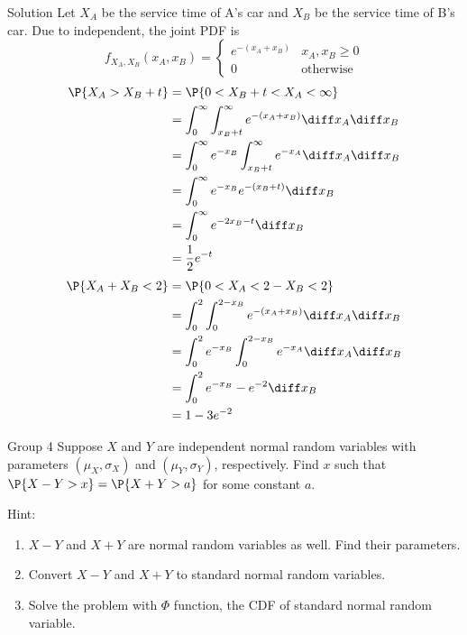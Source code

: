 \documentclass{article}
\theoremstyle{plain}
\theoremstyle{definition}
\theoremstyle{remark}
\begin{document}
\begin{solution}
    {Solution}
    Let $X_A$ be the service time of A's car and $X_B$ be the service time of B's car. Due to independent, the joint PDF is
    \[
    f_{X_A,X_B}(x_A,x_B) = {
        \begin{cases}
            e^{-(x_A+x_B)} & x_A,x_B\geq 0\\
            0 & \text{otherwise}
        \end{cases}
    }
    \]
    \begin{align*}
        \P{X_A>X_B+t}
        &= \P{0<X_B+t<X_A<\infty} \\
        &= \int_{0}^{\infty}\int_{x_B+t}^{\infty}e^{-(x_A+x_B)}\diff x_A \diff x_B \\
        &= \int_{0}^{\infty}e^{-x_B}\int_{x_B+t}^{\infty}e^{-x_A}\diff x_A \diff x_B \\
        &= \int_{0}^{\infty}e^{-x_B}e^{-(x_B+t)}\diff x_B \\
        &= \int_{0}^{\infty}e^{-2x_B-t}\diff x_B \\
        &= \frac{1}{2}e^{-t}
    \end{align*}
    \begin{align*}
        \P{X_A+X_B<2}
        &= \P{0<X_A<2-X_B<2} \\
        &= \int_{0}^{2}\int_{0}^{2-x_B}e^{-(x_A+x_B)}\diff x_A \diff x_B \\
        &= \int_{0}^{2}e^{-x_B}\int_{0}^{2-x_B}e^{-x_A}\diff x_A \diff x_B \\
        &= \int_{0}^{2}e^{-x_B}-e^{-2}\diff x_B \\
        &= 1-3e^{-2}
    \end{align*}
\end{solution}

\begin{problem}
    {Group 4}
    Suppose $X$ and $Y$ are independent normal random variables with parameters $(\mu_X,\sigma_X)$ and $(\mu_Y, \sigma_Y)$, respectively. Find $x$ such that $\P{X-Y>x}=\P{X+Y>a}$ for some constant $a$.
    \begin{solution}
        {Hint:}
        \begin{enumerate}
            \item $X-Y$ and $X+Y$ are normal random variables as well. Find their parameters.
            \item Convert $X-Y$ and $X+Y$ to standard normal random variables.
            \item Solve the problem with $\Phi$ function, the CDF of standard normal random variable.
        \end{enumerate}
    \end{solution}
\end{problem}
\end{document}
